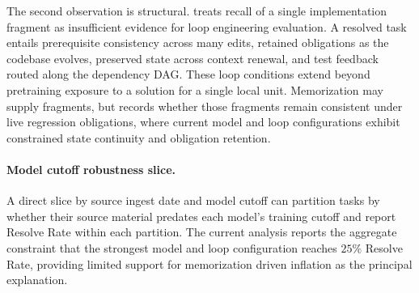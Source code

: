 The second observation is structural. \lhb{} treats recall of a single implementation fragment as insufficient evidence for loop engineering evaluation. A resolved task entails prerequisite consistency across many edits, retained obligations as the codebase evolves, preserved state across context renewal, and test feedback routed along the dependency DAG. These loop conditions extend beyond pretraining exposure to a solution for a single local unit. Memorization may supply fragments, but \lhb{} records whether those fragments remain consistent under live regression obligations, where current model and loop configurations exhibit constrained state continuity and obligation retention.

\paragraph{Model cutoff robustness slice.}

A direct slice by source ingest date and model cutoff can partition tasks by whether their source material predates each model's training cutoff and report Resolve Rate within each partition. The current analysis reports the aggregate constraint that the strongest model and loop configuration reaches $25\%$ Resolve Rate, providing limited support for memorization driven inflation as the principal explanation.
